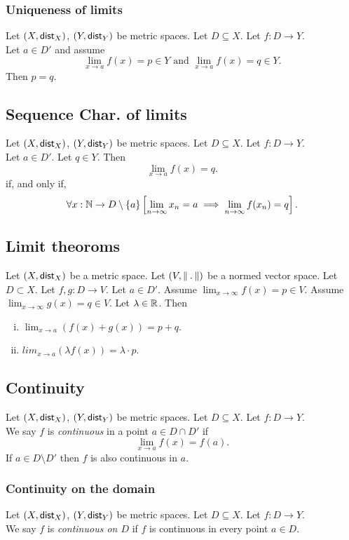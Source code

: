 \subsubsection*{Uniqueness of limits}
\uprop Let $(X, \mathsf{dist}_X)$, $(Y, \mathsf{dist}_Y)$ be metric spaces.
Let $D \subseteq X$. Let $f : D \to Y$.\\
Let $a \in D'$ and assume
\[
    \lim_{x \to a} f(x) = p \in Y \text{ and }
    \lim_{x \to a} f(x) = q \in Y.
\]
Then $p = q$.

\newpage

\subsection{Sequence Char. of limits}
\uthm Let $(X, \mathsf{dist}_X)$, $(Y, \mathsf{dist}_Y)$ be metric spaces.
Let $D \subseteq X$. Let $f : D \to Y$.\\
Let $a \in D'$. Let $q \in Y$. Then
\[
    \lim_{x \to a} f(x) = q.
\]
if, and only if,
\[
    \forall x : \mathbb{N} \to D \setminus \{a\} \left[ \lim_{n \to \infty} x_n = a
    \implies \lim_{n \to \infty} f(x_n) = q \right].
\]

\subsection{Limit theoroms}
Let $(X, \mathsf{dist}_X)$ be a metric space. Let $(V, \norm)$ be a normed vector space.
Let $D \subset X$. Let $f,g : D \to V$. Let $a \in D'$.
Assume $\lim_{x \to \infty} f(x) = p \in V$.
Assume $\lim_{x \to \infty} g(x) = q \in V$.
Let $\lambda \in \mathbb{R}$.
Then
\begin{enumerate}[(i)]
    \item $\lim_{x \to a} \left( f(x) + g(x) \right) = p + q$.
    \item $lim_{x \to a} \left( \lambda f(x) \right) = \lambda \cdot p$.
\end{enumerate}


\subsection{Continuity}
\udef Let $(X, \mathsf{dist}_X)$, $(Y, \mathsf{dist}_Y)$ be metric spaces.
Let $D \subseteq X$. Let $f : D \to Y$.\\
We say $f$ is \emph{continuous} in a point $a \in D \cap D'$ if
\[
    \lim_{x \to a} f(x) = f(a).
\]
If $a \in D \setminus D'$ then $f$ is also continuous in $a$.

\subsubsection*{Continuity on the domain}
\udef Let $(X, \mathsf{dist}_X)$, $(Y, \mathsf{dist}_Y)$ be metric spaces.
Let $D \subseteq X$. Let $f : D \to Y$.\\
We say $f$ is \emph{continuous on $D$} if $f$ is continuous in every point $a \in D$.


